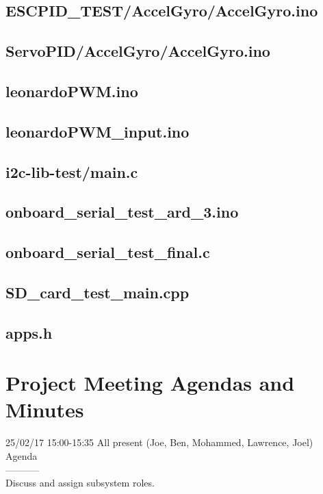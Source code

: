 \documentclass[a4paper,11pt]{article}
\begin{document}
\subsection{ESCPID\_TEST/AccelGyro/AccelGyro.ino}

\subsection{ServoPID/AccelGyro/AccelGyro.ino}

\subsection{leonardoPWM.ino}

\subsection{leonardoPWM\_input.ino}

   \subsection{i2c-lib-test/main.c}
 
   \subsection{onboard\_serial\_test\_ard\_3.ino}
  
   \subsection{onboard\_serial\_test\_final.c}
  
    \subsection{SD\_card\_test\_main.cpp}
 
    \subsection{apps.h}
   
\newpage
\section{Project Meeting Agendas and Minutes}
25/02/17 15:00-15:35 All present (Joe, Ben, Mohammed, Lawrence, Joel)\\
Agenda\\
-----------\\
Discuss and assign subsystem roles.\\
\end{document}

